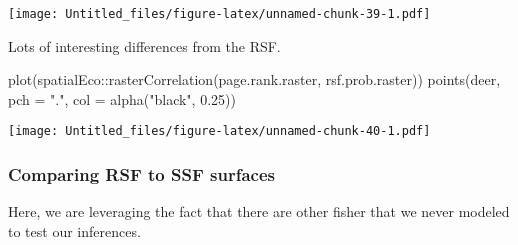 \documentclass[
]{article}
\newenvironment{Shaded}{\begin{snugshade}}{\end{snugshade}}
\newcommand{\AttributeTok}[1]{\textcolor[rgb]{0.77,0.63,0.00}{#1}}
\newcommand{\FloatTok}[1]{\textcolor[rgb]{0.00,0.00,0.81}{#1}}
\newcommand{\FunctionTok}[1]{\textcolor[rgb]{0.00,0.00,0.00}{#1}}
\newcommand{\NormalTok}[1]{#1}
\newcommand{\SpecialCharTok}[1]{\textcolor[rgb]{0.00,0.00,0.00}{#1}}
\newcommand{\StringTok}[1]{\textcolor[rgb]{0.31,0.60,0.02}{#1}}
\begin{document}
\texttt{[image: Untitled\_files/figure-latex/unnamed-chunk-39-1.pdf]}

Lots of interesting differences from the RSF.

\begin{Shaded}
\begin{Highlighting}[]
\FunctionTok{plot}\NormalTok{(spatialEco}\SpecialCharTok{::}\FunctionTok{rasterCorrelation}\NormalTok{(page.rank.raster, rsf.prob.raster))}
\FunctionTok{points}\NormalTok{(deer, }\AttributeTok{pch =} \StringTok{"."}\NormalTok{, }\AttributeTok{col =} \FunctionTok{alpha}\NormalTok{(}\StringTok{"black"}\NormalTok{, }\FloatTok{0.25}\NormalTok{))}
\end{Highlighting}
\end{Shaded}

\texttt{[image: Untitled\_files/figure-latex/unnamed-chunk-40-1.pdf]}

\hypertarget{comparing-rsf-to-ssf-surfaces-1}{%
\subsubsection{Comparing RSF to SSF
surfaces}\label{comparing-rsf-to-ssf-surfaces-1}}

Here, we are leveraging the fact that there are other fisher that we
never modeled to test our inferences.
\end{document}
